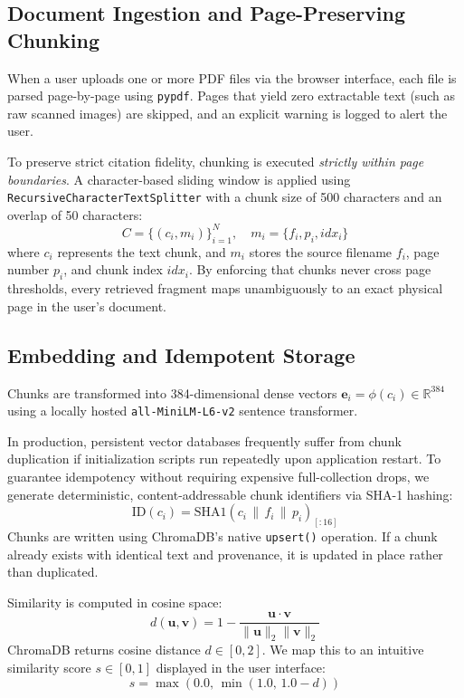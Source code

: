 \documentclass[conference]{IEEEtran}
\begin{document}
\subsection{Document Ingestion and Page-Preserving Chunking}
When a user uploads one or more PDF files via the browser interface, each file is parsed page-by-page using \texttt{pypdf}. Pages that yield zero extractable text (such as raw scanned images) are skipped, and an explicit warning is logged to alert the user.

To preserve strict citation fidelity, chunking is executed \textit{strictly within page boundaries}. A character-based sliding window is applied using \texttt{RecursiveCharacterTextSplitter} with a chunk size of 500 characters and an overlap of 50 characters:
\begin{equation}
C = \{(c_i, m_i)\}_{i=1}^{N}, \quad m_i = \{f_i, p_i, idx_i\}
\end{equation}
where $c_i$ represents the text chunk, and $m_i$ stores the source filename $f_i$, page number $p_i$, and chunk index $idx_i$. By enforcing that chunks never cross page thresholds, every retrieved fragment maps unambiguously to an exact physical page in the user's document.

\subsection{Embedding and Idempotent Storage}
Chunks are transformed into 384-dimensional dense vectors $\mathbf{e}_i = \phi(c_i) \in \mathbb{R}^{384}$ using a locally hosted \texttt{all-MiniLM-L6-v2} sentence transformer. 

In production, persistent vector databases frequently suffer from chunk duplication if initialization scripts run repeatedly upon application restart. To guarantee idempotency without requiring expensive full-collection drops, we generate deterministic, content-addressable chunk identifiers via SHA-1 hashing:
\begin{equation}
\mathrm{ID}(c_i) = \mathrm{SHA1}(c_i \,\|\, f_i \,\|\, p_i)_{[:16]}
\end{equation}
Chunks are written using ChromaDB's native \texttt{upsert()} operation. If a chunk already exists with identical text and provenance, it is updated in place rather than duplicated.

Similarity is computed in cosine space:
\begin{equation}
d(\mathbf{u}, \mathbf{v}) = 1 - \frac{\mathbf{u} \cdot \mathbf{v}}{\|\mathbf{u}\|_2 \|\mathbf{v}\|_2}
\end{equation}
ChromaDB returns cosine distance $d \in [0, 2]$. We map this to an intuitive similarity score $s \in [0, 1]$ displayed in the user interface:
\begin{equation}
s = \max\left(0.0, \, \min\left(1.0, \, 1.0 - d\right)\right)
\end{equation}
\end{document}
